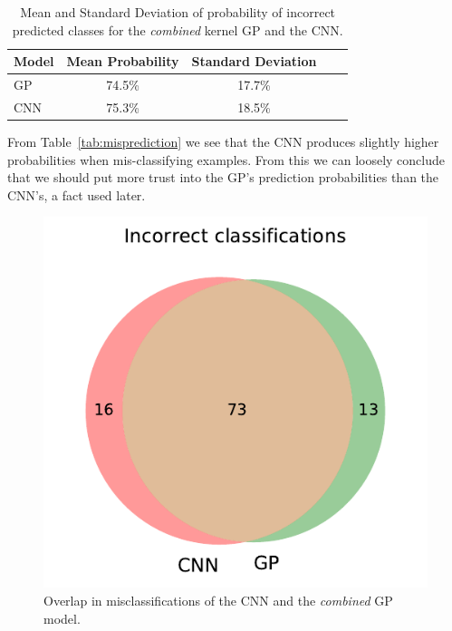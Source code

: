 \documentclass{article}
\begin{document}
\begin{table}[htb]
\caption{Mean and Standard Deviation of probability of incorrect predicted classes for the \textit{combined} kernel GP and the CNN.}
\label{tab:misprediction}
\vskip 0.15in
\begin{center}
\begin{small}
\begin{sc}
\begin{tabular}{lcccr}
\toprule
Model			& Mean Probability  	& Standard Deviation  \\
\midrule
GP   			& 74.5\% 		&  17.7\% \\
CNN			 	& 75.3\%		& 18.5\%  \\
\bottomrule
\end{tabular}
\end{sc}
\end{small}
\end{center}
\vskip -0.1in
\label{tab:mispredictions}
\end{table}


From Table~\ref{tab:misprediction} we see that the CNN produces slightly higher probabilities when mis-classifying examples. From this we can loosely conclude that we should put more trust into the GP's prediction probabilities than the CNN's, a fact used later.





\begin{figure}[htb]
\centering
\includegraphics[scale=0.50]{figures/mnist/venn-Linear-Matern32-Kernel-GP.pdf}
\caption{Overlap in misclassifications of the CNN and the \textit{combined} GP model.}
\label{fig:venn}
\end{figure}
\end{document}
